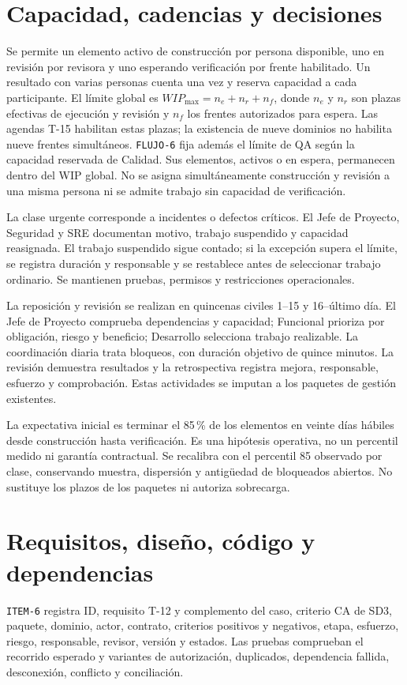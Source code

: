 \section{Capacidad, cadencias y decisiones}
Se permite un elemento activo de construcción por persona disponible, uno en revisión por revisora y uno esperando verificación por frente habilitado. Un resultado con varias personas cuenta una vez y reserva capacidad a cada participante. El límite global es $WIP_{\max}=n_e+n_r+n_f$, donde $n_e$ y $n_r$ son plazas efectivas de ejecución y revisión y $n_f$ los frentes autorizados para espera. Las agendas T-15 habilitan estas plazas; la existencia de nueve dominios no habilita nueve frentes simultáneos. \texttt{FLUJO-6} fija además el límite de QA según la capacidad reservada de Calidad. Sus elementos, activos o en espera, permanecen dentro del WIP global. No se asigna simultáneamente construcción y revisión a una misma persona ni se admite trabajo sin capacidad de verificación.

La clase urgente corresponde a incidentes o defectos críticos. El Jefe de Proyecto, Seguridad y SRE documentan motivo, trabajo suspendido y capacidad reasignada. El trabajo suspendido sigue contado; si la excepción supera el límite, se registra duración y responsable y se restablece antes de seleccionar trabajo ordinario. Se mantienen pruebas, permisos y restricciones operacionales. \parencite[Actively Managing Items in a Workflow, p.~4]{sd6-kanban}

La reposición y revisión se realizan en quincenas civiles 1--15 y 16--último día. El Jefe de Proyecto comprueba dependencias y capacidad; Funcional prioriza por obligación, riesgo y beneficio; Desarrollo selecciona trabajo realizable. La coordinación diaria trata bloqueos, con duración objetivo de quince minutos. La revisión demuestra resultados y la retrospectiva registra mejora, responsable, esfuerzo y comprobación. Estas actividades se imputan a los paquetes de gestión existentes.

La expectativa inicial es terminar el 85\,\% de los elementos en veinte días hábiles desde construcción hasta verificación. Es una hipótesis operativa, no un percentil medido ni garantía contractual. Se recalibra con el percentil 85 observado por clase, conservando muestra, dispersión y antigüedad de bloqueados abiertos. No sustituye los plazos de los paquetes ni autoriza sobrecarga. \parencite[Definition of Workflow y Flow Metrics, pp.~3--5]{sd6-kanban}

\section{Requisitos, diseño, código y dependencias}
\texttt{ITEM-6} registra ID, requisito T-12 y complemento del caso, criterio CA de SD3, paquete, dominio, actor, contrato, criterios positivos y negativos, etapa, esfuerzo, riesgo, responsable, revisor, versión y estados. Las pruebas comprueban el recorrido esperado y variantes de autorización, duplicados, dependencia fallida, desconexión, conflicto y conciliación.

